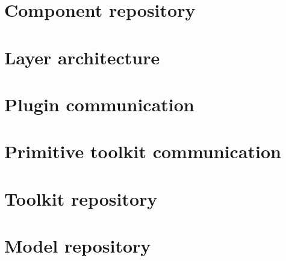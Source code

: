 \section{Component repository}

\section{Layer architecture}

\section{Plugin communication}

\section{Primitive toolkit communication}

\section{Toolkit repository}

\section{Model repository}
